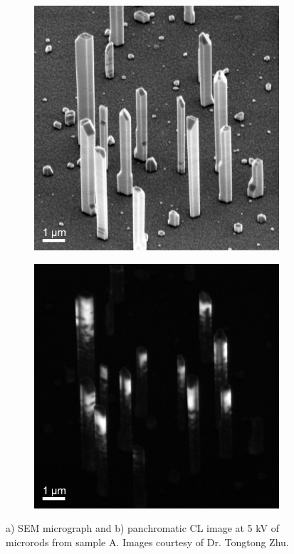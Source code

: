 \begin{figure}[th]
	\begin{subfigure}[b]{0.4\textwidth}
		\centering
		\includegraphics[width=1\linewidth]{Figs/Ch6/SEM_7262_2}
		\caption{}
		
	\end{subfigure}%
	\hspace*{1.5cm}
	\begin{subfigure}[b]{0.4\textwidth}
		\centering
		\includegraphics[width=1\linewidth]{Figs/Ch6/CL_7262_2}
		\caption{}
	\end{subfigure}%
	
	\caption{a) SEM micrograph and b) panchromatic CL image at 5 kV of microrods from sample A. Images courtesy of Dr. Tongtong Zhu.}
	\label{Asub}
\end{figure}
\FloatBarrier

